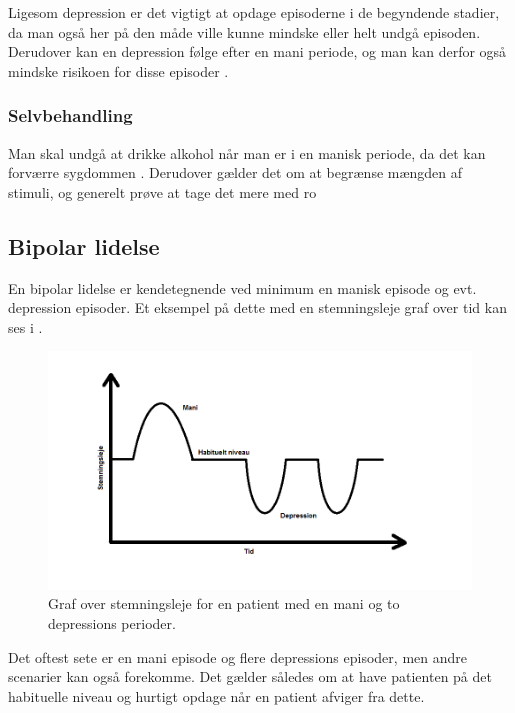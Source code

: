 Ligesom depression er det vigtigt at opdage episoderne i de begyndende stadier, da man også her på den måde ville kunne mindske eller helt undgå episoden.
Derudover kan en depression følge efter en mani periode, og man kan derfor også mindske risikoen for disse episoder \citep{misc:bipolarsundhed}.

\subsubsection{Selvbehandling}
Man skal undgå at drikke alkohol når man er i en manisk periode, da det kan forværre sygdommen \citep{misc:netpsykmani}.
Derudover gælder det om at begrænse mængden af stimuli, og generelt prøve at tage det mere med ro \citep{misc:janne-rasmussen}

\subsection{Bipolar lidelse}
En bipolar lidelse er kendetegnende ved minimum en manisk episode og evt. depression episoder.
Et eksempel på dette med en stemningsleje graf over tid kan ses i .

\begin{figure}
	\centering
	\includegraphics[scale=0.5]{media/affektivstemningsleje}
	\caption{Graf over stemningsleje for en patient med en mani og to depressions perioder.}\label{fig:stemningslejegrafeksempel}
\end{figure}

Det oftest sete er en mani episode og flere depressions episoder, men andre scenarier kan også forekomme.
Det gælder således om at have patienten på det habituelle niveau og hurtigt opdage når en patient afviger fra dette.